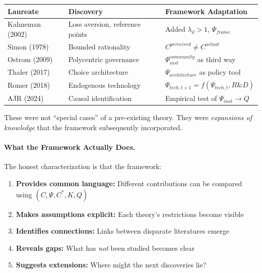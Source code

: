 \begin{center}
\renewcommand{\arraystretch}{1.3}
\small
\begin{tabular}{lll}
\hline
\textbf{Laureate} & \textbf{Discovery} & \textbf{Framework Adaptation} \\
\hline
Kahneman (2002) & Loss aversion, reference points & Added $\lambda_d > 1$, $\Psi_{frame}$ \\
Simon (1978) & Bounded rationality & $C^{perceived} \neq C^{actual}$ \\
Ostrom (2009) & Polycentric governance & $\Psi_{inst}^{community}$ as third way \\
Thaler (2017) & Choice architecture & $\Psi_{architecture}$ as policy tool \\
Romer (2018) & Endogenous technology & $\Psi_{tech,t+1} = f(\Psi_{tech,t}, R\&D)$ \\
AJR (2024) & Causal identification & Empirical test of $\Psi_{inst} \to Q$ \\
\hline
\end{tabular}
\end{center}

These were not ``special cases'' of a pre-existing theory.
They were \emph{expansions of knowledge} that the framework subsequently incorporated.

\paragraph{What the Framework Actually Does.}
The honest characterization is that the framework:
\begin{enumerate}
  \item \textbf{Provides common language:} Different contributions can be 
        compared using $(C, \Psi, C^*, K, Q)$
  \item \textbf{Makes assumptions explicit:} Each theory's restrictions become visible
  \item \textbf{Identifies connections:} Links between disparate literatures emerge
  \item \textbf{Reveals gaps:} What has \emph{not} been studied becomes clear
  \item \textbf{Suggests extensions:} Where might the next discoveries lie?
\end{enumerate}

